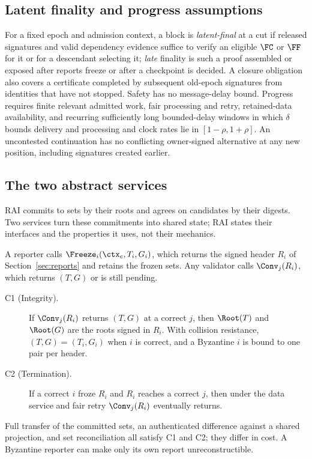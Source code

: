 \subsection{Latent finality and progress assumptions}
For a fixed epoch and admission context, a block is \emph{latent-final} at a cut if released signatures and valid dependency evidence suffice to verify an eligible $\FC$ or $\FF$ for it or for a descendant selecting it; \emph{late} finality is such a proof assembled or exposed after reports freeze or after a checkpoint is decided. A closure obligation also covers a certificate completed by subsequent old-epoch signatures from identities that have not stopped. Safety has no message-delay bound. Progress requires finite relevant admitted work, fair processing and retry, retained-data availability, and recurring sufficiently long bounded-delay windows in which $\delta$ bounds delivery and processing and clock rates lie in $[1-\rho,1+\rho]$. An uncontested continuation has no conflicting owner-signed alternative at any new position, including signatures created earlier.

\subsection{The two abstract services}
\label{sec:services}
RAI commits to sets by their roots and agrees on candidates by their digests. Two services turn these commitments into shared state; RAI states their interfaces and the properties it uses, not their mechanics.

A reporter calls $\Freeze_i(\ctx_e,T_i,G_i)$, which returns the signed header $R_i$ of Section~\ref{sec:reports} and retains the frozen sets. Any validator calls $\Conv_j(R_i)$, which returns $(T,G)$ or is still pending.
\begin{description}
\item[C1 (Integrity).] If $\Conv_j(R_i)$ returns $(T,G)$ at a correct $j$, then $\Root(T)$ and $\Root(G)$ are the roots signed in $R_i$. With collision resistance, $(T,G)=(T_i,G_i)$ when $i$ is correct, and a Byzantine $i$ is bound to one pair per header.
\item[C2 (Termination).] If a correct $i$ froze $R_i$ and $R_i$ reaches a correct $j$, then under the data service and fair retry $\Conv_j(R_i)$ eventually returns.
\end{description}
Full transfer of the committed sets, an authenticated difference against a shared projection, and set reconciliation all satisfy C1 and C2; they differ in cost. A Byzantine reporter can make only its own report unreconstructible.

